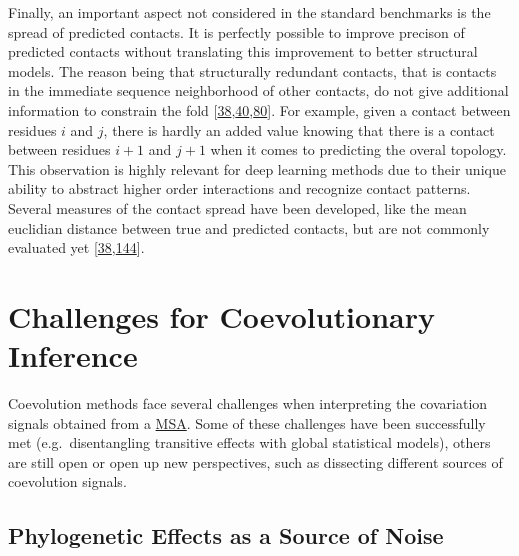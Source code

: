 \documentclass[11pt,a4paper,twoside]{book}
\theoremstyle{definition}
\theoremstyle{definition}
\theoremstyle{remark}
\begin{document}
Finally, an important aspect not considered in the standard benchmarks
is the spread of predicted contacts. It is perfectly possible to improve
precison of predicted contacts without translating this improvement to
better structural models. The reason being that structurally redundant
contacts, that is contacts in the immediate sequence neighborhood of
other contacts, do not give additional information to constrain the fold
{[}\protect\hyperlink{ref-Marks2011}{38},\protect\hyperlink{ref-Kim2014}{40},\protect\hyperlink{ref-Jones2015}{80}{]}.
For example, given a contact between residues \(i\) and \(j\), there is
hardly an added value knowing that there is a contact between residues
\(i\!+\!1\) and \(j\!+\!1\) when it comes to predicting the overal
topology. This observation is highly relevant for deep learning methods
due to their unique ability to abstract higher order interactions and
recognize contact patterns. Several measures of the contact spread have
been developed, like the mean euclidian distance between true and
predicted contacts, but are not commonly evaluated yet
{[}\protect\hyperlink{ref-Marks2011}{38},\protect\hyperlink{ref-DeOliveira2016}{144}{]}.

\section{Challenges for Coevolutionary Inference}\label{challenges}

Coevolution methods face several challenges when interpreting the
covariation signals obtained from a \protect\hyperlink{abbrev}{MSA}.
Some of these challenges have been successfully met (e.g.~disentangling
transitive effects with global statistical models), others are still
open or open up new perspectives, such as dissecting different sources
of coevolution signals.

\subsection{Phylogenetic Effects as a Source of
Noise}\label{phylogenetic-effects-as-a-source-of-noise}
\end{document}
